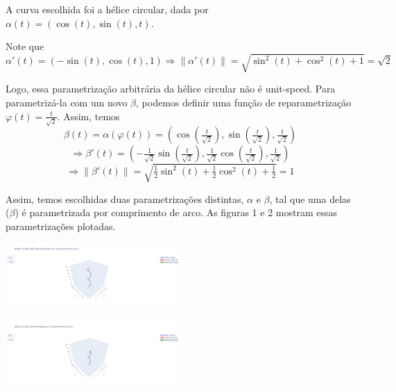 \documentclass[../main.tex]{subfiles}
\begin{document}
\begin{solucao}
	A curva escolhida foi a hélice circular, dada por $\alpha(t)=(\cos(t),\sin(t), t)$.
	
	Note que
	\[
	\alpha'(t)=(-\sin(t),\cos(t),1)\Rightarrow\|\alpha'(t)\|=\sqrt{\sin^2(t)+\cos^2(t)+1}=\sqrt{2}
	\]
	
	Logo, essa parametrização arbitrária da hélice circular não é unit-speed. Para parametrizá-la com um novo $\beta$, podemos definir uma função de reparametrização $\varphi(t)=\frac{t}{\sqrt{2}}$. Assim, temos
	\[
	\beta(t)=\alpha(\varphi(t))=(\cos(\tfrac{t}{\sqrt{2}}), \sin(\tfrac{t}{\sqrt{2}}), \tfrac{t}{\sqrt{2}})
	\]
	\[
	\Rightarrow \beta'(t)=(-\tfrac{1}{\sqrt{2}}\sin(\tfrac{t}{\sqrt{2}}), \tfrac{1}{\sqrt{2}}\cos(\tfrac{t}{\sqrt{2}}), \tfrac{1}{\sqrt{2}})
	\]
	\[
	\Rightarrow \|\beta'(t)\|=\sqrt{\tfrac{1}{2}\sin^2(t)+\tfrac{1}{2}\cos^2(t)+\tfrac{1}{2}}=1
	\]
	
	Assim, temos escolhidas duas parametrizações distintas, $\alpha$ e $\beta$, tal que uma delas ($\beta$) é parametrizada por comprimento de arco. As figuras 1 e 2 mostram essas parametrizações plotadas.
	
	\begin{center}
		\includegraphics[width=0.5\textwidth]{imagens/lista02/picture_lista02_q06_item01.png}
	\end{center}
	
	\begin{center}
		\includegraphics[width=0.5\textwidth]{imagens/lista02/picture_lista02_q06_item02.png}
	\end{center}
\end{solucao}
\end{document}
